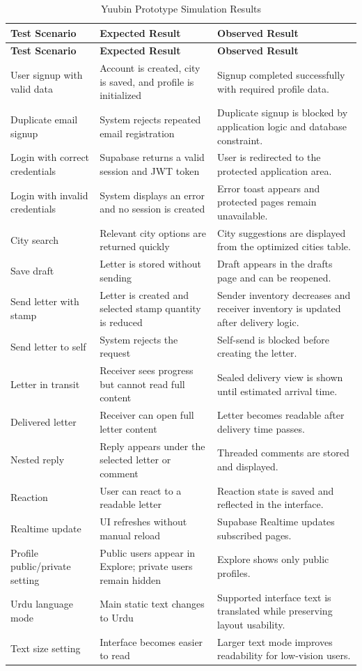 ﻿\documentclass[12pt,a4paper]{report}
\begin{document}
\begin{longtable}{p{4cm} p{5cm} p{5cm}}
\caption{Yuubin Prototype Simulation Results}
\label{tab:prototype_simulation_results}\\
\toprule
\textbf{Test Scenario} & \textbf{Expected Result} & \textbf{Observed Result} \\
\midrule
\endfirsthead
\toprule
\textbf{Test Scenario} & \textbf{Expected Result} & \textbf{Observed Result} \\
\midrule
\endhead
User signup with valid data & Account is created, city is saved, and profile is initialized & Signup completed successfully with required profile data. \\
Duplicate email signup & System rejects repeated email registration & Duplicate signup is blocked by application logic and database constraint. \\
Login with correct credentials & Supabase returns a valid session and JWT token & User is redirected to the protected application area. \\
Login with invalid credentials & System displays an error and no session is created & Error toast appears and protected pages remain unavailable. \\
City search & Relevant city options are returned quickly & City suggestions are displayed from the optimized cities table. \\
Save draft & Letter is stored without sending & Draft appears in the drafts page and can be reopened. \\
Send letter with stamp & Letter is created and selected stamp quantity is reduced & Sender inventory decreases and receiver inventory is updated after delivery logic. \\
Send letter to self & System rejects the request & Self-send is blocked before creating the letter. \\
Letter in transit & Receiver sees progress but cannot read full content & Sealed delivery view is shown until estimated arrival time. \\
Delivered letter & Receiver can open full letter content & Letter becomes readable after delivery time passes. \\
Nested reply & Reply appears under the selected letter or comment & Threaded comments are stored and displayed. \\
Reaction & User can react to a readable letter & Reaction state is saved and reflected in the interface. \\
Realtime update & UI refreshes without manual reload & Supabase Realtime updates subscribed pages. \\
Profile public/private setting & Public users appear in Explore; private users remain hidden & Explore shows only public profiles. \\
Urdu language mode & Main static text changes to Urdu & Supported interface text is translated while preserving layout usability. \\
Text size setting & Interface becomes easier to read & Larger text mode improves readability for low-vision users. \\
\bottomrule
\end{longtable}
\end{document}
